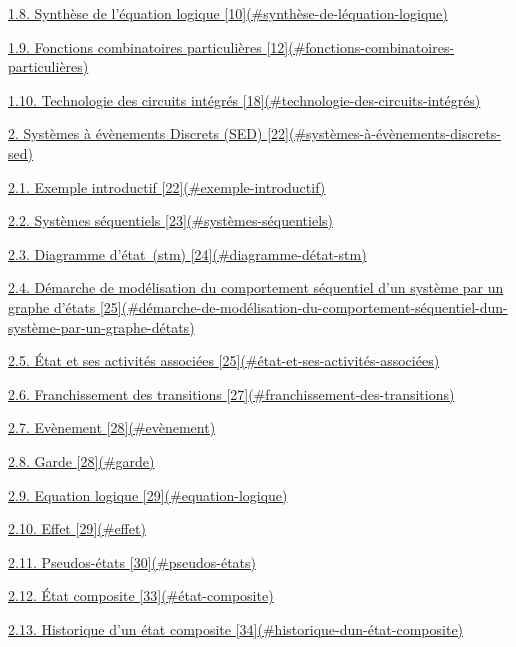 \protect\hyperlink{synthuxe8se-de-luxe9quation-logique}{1.8. Synthèse de l'équation logique {[}10{]}(\#synthèse-de-léquation-logique)}

\protect\hyperlink{fonctions-combinatoires-particuliuxe8res}{1.9. Fonctions combinatoires particulières {[}12{]}(\#fonctions-combinatoires-particulières)}

\protect\hyperlink{technologie-des-circuits-intuxe9gruxe9s}{1.10. Technologie des circuits intégrés {[}18{]}(\#technologie-des-circuits-intégrés)}

\protect\hyperlink{systuxe8mes-uxe0-uxe9vuxe8nements-discrets-sed}{2. Systèmes à évènements Discrets (SED) {[}22{]}(\#systèmes-à-évènements-discrets-sed)}

\protect\hyperlink{exemple-introductif}{2.1. Exemple introductif {[}22{]}(\#exemple-introductif)}

\protect\hyperlink{systuxe8mes-suxe9quentiels}{2.2. Systèmes séquentiels {[}23{]}(\#systèmes-séquentiels)}

\protect\hyperlink{diagramme-duxe9tat-stm}{2.3. Diagramme d'état~(stm) {[}24{]}(\#diagramme-détat-stm)}

\protect\hyperlink{duxe9marche-de-moduxe9lisation-du-comportement-suxe9quentiel-dun-systuxe8me-par-un-graphe-duxe9tats}{2.4. Démarche de modélisation du comportement séquentiel d'un système par un graphe d'états {[}25{]}(\#démarche-de-modélisation-du-comportement-séquentiel-dun-système-par-un-graphe-détats)}

\protect\hyperlink{uxe9tat-et-ses-activituxe9s-associuxe9es}{2.5. État et ses activités associées {[}25{]}(\#état-et-ses-activités-associées)}

\protect\hyperlink{franchissement-des-transitions}{2.6. Franchissement des transitions {[}27{]}(\#franchissement-des-transitions)}

\protect\hyperlink{evuxe8nement}{2.7. Evènement {[}28{]}(\#evènement)}

\protect\hyperlink{garde}{2.8. Garde {[}28{]}(\#garde)}

\protect\hyperlink{equation-logique}{2.9. Equation logique {[}29{]}(\#equation-logique)}

\protect\hyperlink{effet}{2.10. Effet {[}29{]}(\#effet)}

\protect\hyperlink{pseudos-uxe9tats}{2.11. Pseudos-états {[}30{]}(\#pseudos-états)}

\protect\hyperlink{uxe9tat-composite}{2.12. État composite {[}33{]}(\#état-composite)}

\protect\hyperlink{historique-dun-uxe9tat-composite}{2.13. Historique d'un état composite {[}34{]}(\#historique-dun-état-composite)}

